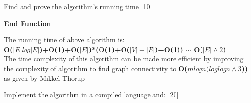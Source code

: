 \documentclass[12pt,letterpaper, onecolumn]{exam}
\begin{document}
\begin{questions}
\begin{solution}
\end{solution}
\pagebreak
\question Find and prove the algorithm's running time [10]
\begin{solution}
\begin{algorithm}[H]
        \vspace{12pt}
        \textbf{End Function}
        \label{MinimumSpanningTreeAlgo} 
        \end{algorithm}
        The running time of above algorithm is:\\ \textbf{O($|E|log|E|$)+O(1)+O($|E|$)*(O(1)+O($|V|+|E|$)+O(1)) $\sim$ O($|E|\wedge 2$)}\\
        The time complexity of this algorithm can be made more efficient by 
        improving the complexity of algorithm to find graph connectivity to \textbf{O($mlogn(log logn \wedge 3$))} as given by Mikkel Thorup
\end{solution}
\pagebreak
\question Implement the algorithm in a compiled language and: [20]
\begin{solution}
\end{solution}
\end{questions}
\end{document}
